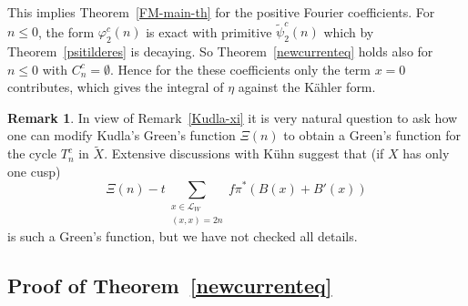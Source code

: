 \documentclass[12pt,leqno]{amsart}
\numberwithin{equation}{section}
\theoremstyle{plain}
\theoremstyle{definition}
\newtheorem{remark}[theorem]{Remark}
\theoremstyle{remark}
\newcommand{\calL}{\mathcal{L}}
\begin{document}
This implies Theorem~\ref{FM-main-th} for the positive Fourier coefficients. For $n\leq 0$, the form $\varphi^c_{2}(n)$ is exact with primitive $\tilde{\psi}^c_{2}(n)$ which by Theorem~\ref{psitilderes} is decaying. So Theorem~\ref{newcurrenteq} holds also for $n \leq 0$ with $C_n^c = \emptyset$. Hence for the these coefficients only the term $x=0$ contributes, which gives the integral of $\eta$ against the K\"ahler form. 

\begin{remark}\label{Kudla-modification}
In view of Remark~\ref{Kudla-xi} it is very natural question to ask how one can modify Kudla's Green's function $\Xi(n)$ to obtain a Green's function for the cycle $T_n^c$ in $\tilde{X}$. Extensive discussions with K\"uhn suggest that (if $X$ has only one cusp) 
\[
\Xi(n) - t \sum_{\substack{x \in \calL_W\\ (x,x)=2n}} f \pi^{\ast}(B(x)+B'(x))
\]
is such a Green's function, but we have not checked all details.
\end{remark}


\subsection{Proof of Theorem~\ref{newcurrenteq} }\label{8.1}
\end{document}
